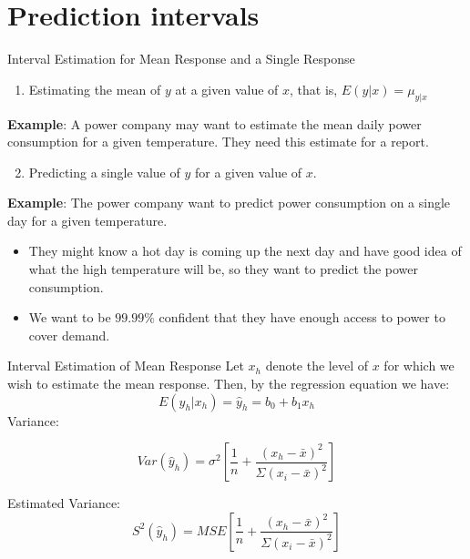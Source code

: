 \documentclass[
  ignorenonframetext,
]{beamer}
\providecommand{\tightlist}{%
  \setlength{\itemsep}{0pt}\setlength{\parskip}{0pt}}
\begin{document}
\hypertarget{prediction-intervals}{%
\section{Prediction intervals}\label{prediction-intervals}}

\begin{frame}{Interval Estimation for Mean Response and a Single
Response}
\protect\hypertarget{interval-estimation-for-mean-response-and-a-single-response}{}
\begin{enumerate}
\tightlist
\item
  Estimating the mean of \(y\) at a given value of \(x\), that is,
  \(E(y|x)=\mu_{y|x}\)
\end{enumerate}

\textbf{Example}: A power company may want to estimate the mean daily
power consumption for a given temperature. They need this estimate for a
report.

\begin{enumerate}
\setcounter{enumi}{1}
\tightlist
\item
  Predicting a single value of \(y\) for a given value of \(x\).
\end{enumerate}

\textbf{Example}: The power company want to predict power consumption on
a single day for a given temperature.

\begin{itemize}
\item
  They might know a hot day is coming up the next day and have good idea
  of what the high temperature will be, so they want to predict the
  power consumption.
\item
  We want to be \(99.99\%\) confident that they have enough access to
  power to cover demand.
\end{itemize}
\end{frame}

\begin{frame}{Interval Estimation of Mean Response}
\protect\hypertarget{interval-estimation-of-mean-response}{}
Let \(x_h\) denote the level of \(x\) for which we wish to estimate the
mean response. Then, by the regression equation we have:
\[E(y_h|x_h)=\hat{y}_h=b_0+b_1x_h\] Variance:

\[Var(\hat{y}_h)=\sigma^2\left[\frac{1}{n}+\frac{(x_h-\bar{x})^2}{\Sigma(x_i-\bar{x})^2}\right]\]

Estimated Variance:
\[S^2(\hat{y}_h)=MSE\left[\frac{1}{n}+\frac{(x_h-\bar{x})^2}{\Sigma(x_i-\bar{x})^2}\right]\]
\end{frame}
\end{document}
